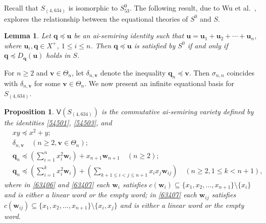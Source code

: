 \documentclass[reqno]{amsart}
\theoremstyle{plain}
\newtheorem{lem}[thm]{Lemma}
\newtheorem{pro}[thm]{Proposition}
\theoremstyle{definition}
\newcommand{\bq}{\mathbf{q}}
\newcommand{\bu}{\mathbf{u}}
\newcommand{\bv}{\mathbf{v}}
\newcommand{\bw}{\mathbf{w}}
\begin{document}
Recall that $S_{(4, 634)}$ is isomorphic to $S^0_{53}$.
The following result, due to Wu et al.~\cite[Proposition 1.5]{wrz},
explores the relationship between the equational theories of $S^0$ and $S$.

\begin{lem}\label{lem04}
Let $\bq\preceq \bu$ be an ai-semiring identity such that
$\bu=\bu_1+\bu_2+\cdots+\bu_n$, where $\bu_i, \bq \in X^+$, $1\leq i \leq n$.
Then $\bq\preceq \bu$ is satisfied by ${S}^0$ if and only if
$\bq\preceq D_\bq(\bu)$ holds in $S$.
\end{lem}

For $n \geq 2$ and $\bv\in \Theta_n$,
let $\delta_{n,\bv}$ denote the inequality $\bq_n \preceq \bv$.
Then $\sigma_{n,n}$ coincides with $\delta_{n,\bv}$ for some $\bv\in \Theta_n$.
We now present an infinite equational basis for $S_{(4, 634)}$.
\begin{pro}\label{pro63401}
$\mathsf{V}(S_{(4, 634)})$
is the commutative ai-semiring variety defined by the identities \eqref{54501}, \eqref{54503}, and
\begin{align}
&xy \preceq x^2+y;\label{63404}\\
&\delta_{n,\bv} \quad (n \geq 2, \bv\in \Theta_n); \label{63405}\\
&\bq_n \preceq \left(\sum_{i=1}^{n}x_i^2\bw_i\right)+x_{n+1}\bw_{n+1}\quad (n \geq 2); \label{63406}\\
&\bq_n \preceq \left(\sum_{i=1}^{k}x_i^2\bw_i\right)+\left(\sum_{k+1\leq i<j\leq n+1}x_ix_j\bw_{ij}\right)\quad (n \geq 2, 1\leq k<n+1),\label{63407}
\end{align}
where in \eqref{63406} and \eqref{63407} each $\bw_i$ satisfies
$c(\bw_i) \subseteq \{x_1, x_2, \dots, x_{n+1}\} \setminus \{x_i\}$
and is either a linear word or the empty word;
in \eqref{63407} each $\bw_{ij}$ satisfies
$c(\bw_{ij}) \subseteq \{x_1, x_2, \dots, x_{n+1}\} \setminus \{x_i, x_j\}$
and is either a linear word or the empty word.
\end{pro}
\end{document}
